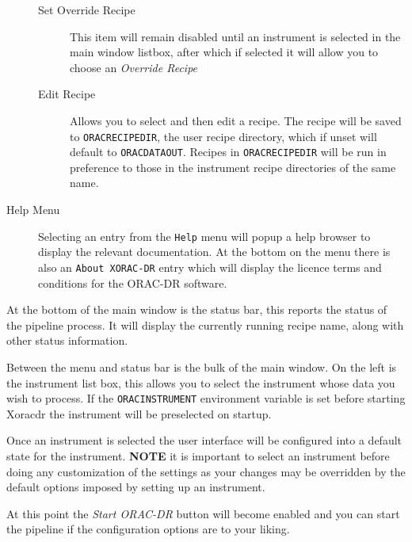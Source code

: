 \documentclass[twoside,11pt]{article}
\renewcommand{\_}{\texttt{\symbol{95}}}
\begin{document}
\begin{description}
\begin{description}
\item[{Set Override Recipe}] \mbox{}

This item will remain disabled until an instrument is selected in the
main window listbox, after which if selected it will allow you to
choose an \textit{Override Recipe}


\item[{Edit Recipe}] \mbox{}

Allows you to select and then edit a recipe. The recipe will be saved
to \texttt{ORAC\_RECIPE\_DIR}, the user recipe directory, which if unset will
default to \texttt{ORAC\_DATA\_OUT}. Recipes in \texttt{ORAC\_RECIPE\_DIR} will be run
in preference to those in the instrument recipe directories of the
same name.

\end{description}

\item[{Help Menu}] \mbox{}

Selecting an entry from the \texttt{Help} menu will popup a help browser to
display the relevant documentation. At the bottom on the menu there is
also an \texttt{About XORAC-DR} entry which will display the licence terms
and conditions for the ORAC-DR software.

\end{description}


At the bottom of the main window is the status bar, this reports the
status of the pipeline process. It will display the currently running
recipe name, along with other status information.



Between the menu and status bar is the bulk of the main window. On the
left is the instrument list box, this allows you to select the
instrument whose data you wish to process. If the \texttt{ORAC\_INSTRUMENT}
environment variable is set before starting Xoracdr the instrument
will be preselected on startup.



Once an instrument is selected the user interface will be configured
into a default state for the instrument. \textbf{NOTE} it is important to
select an instrument before doing any customization of the settings as
your changes may be overridden by the default options imposed by
setting up an instrument.



At this point the \textit{Start ORAC-DR} button will become enabled and you
can start the pipeline if the configuration options are to your
liking.
\end{document}
